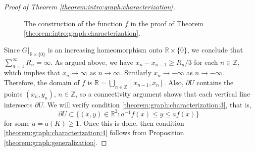 \documentclass[letterpaper]{amsart}
\theoremstyle{plain}
\theoremstyle{definition}
\theoremstyle{remark}
\numberwithin{equation}{section}
\numberwithin{theorem}{section}
\newcommand{\R}{\mathbb R}
\newcommand{\Z}{\mathbb Z}
\begin{document}
\begin{proof}[Proof of Theorem \ref{theorem:intro:graph:characterization}]
\begin{figure}
	\caption{The construction of the function $f$ in the proof of Theorem \ref{theorem:intro:graph:characterization}.}\label{figure:construction_f}
\end{figure}

Since $G|_{\R\times \{0\}}$ is an increasing homeomorphism onto $\R\times \{0\}$, we conclude that $\sum_{n=1}^\infty R_n=\infty$. As argued above, we have $x_n-x_{n-1}\geq R_n/3$ for each $n\in \Z$, which implies that $x_n\to \infty$ as $n\to\infty$. Similarly $x_n\to-\infty$ as $n\to-\infty$. Therefore, the domain of $f$ is $\R= \bigcup_{n\in \Z}[x_{n-1},x_n]$. Also, $\partial U$ contains the points $(x_n,y_n)$, $n\in \Z$, so a connectivity argument shows that each vertical line intersects $\partial U$. We will verify condition \ref{theorem:graph:characterization:3}, that is, 
$$\partial U\subset \{ (x,y)\in \R^2: a^{-1}f(x)\leq y\leq af(x)\}$$
for some $a=a(K)\geq 1$. Once this is done, then condition \ref{theorem:graph:characterization:4} follows from Proposition \ref{theorem:graph:generalization}.


\end{proof}
\end{document}

